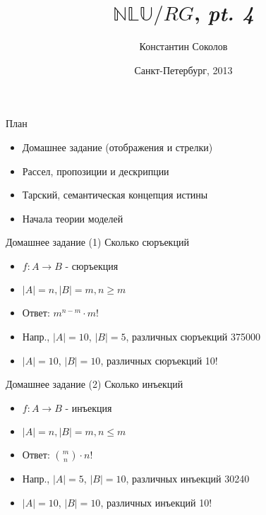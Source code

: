 \documentclass{beamer}
\begin{document}
\title{\huge{$\mathbb{NLU}/RG$, \textit{pt. 4}}}
\author{Константин Соколов}
\date{Санкт-Петербург, 2013} 
\begin{frame}
    \thispagestyle{empty}
    \titlepage
\end{frame}

\begin{frame}{План}
    \setcounter{framenumber}{1}
    \begin{itemize}
        \item Домашнее задание (отображения и стрелки)
        \item Рассел, пропозиции и дескрипции
        \item Тарский, семантическая концепция истины
        \item Начала теории моделей
    \end{itemize}
\end{frame}

\begin{frame}{Домашнее задание (1)}
Сколько сюръекций\\
\bigskip
  \begin{itemize}
    \item $f : A \to B$ - сюръекция
    \item $\left\vert{A}\right\vert = n, \left\vert{B}\right\vert = m, n \geq m$
    \item Ответ: $m^{n-m} \cdot m!$
    \item Напр., $\left\vert{A}\right\vert = 10$, $\left\vert{B}\right\vert = 5$, различных сюръекций 375000
    \item $\left\vert{A}\right\vert = 10$, $\left\vert{B}\right\vert = 10$, различных сюръекций 10!
  \end{itemize}  
\end{frame}

\begin{frame}{Домашнее задание (2)}
Сколько инъекций\\
\bigskip
  \begin{itemize}
    \item $f : A \to B$ - инъекция
    \item $\left\vert{A}\right\vert = n, \left\vert{B}\right\vert = m, n \leq m$
    \item Ответ: ${m \choose n} \cdot n!$
    \item Напр., $\left\vert{A}\right\vert = 5$, $\left\vert{B}\right\vert = 10$, различных инъекций 30240 
    \item $\left\vert{A}\right\vert = 10$, $\left\vert{B}\right\vert = 10$, различных инъекций 10! 
  \end{itemize}  
\end{frame}
\end{document}
